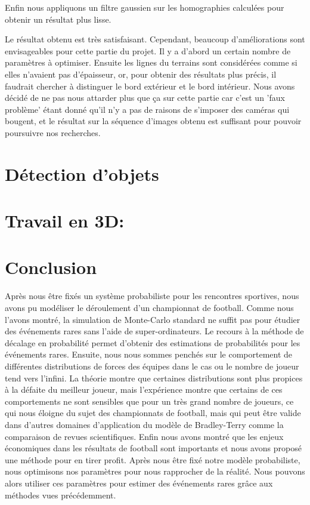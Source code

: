 \documentclass[a4paper]{article}
\begin{document}
Enfin nous appliquons un filtre gaussien sur les homographies calculées pour obtenir un résultat plus lisse.

Le résultat obtenu est très satisfaisant. Cependant, beaucoup d'améliorations sont envisageables pour cette partie du projet. Il y a d'abord un certain nombre de paramètres à optimiser. Ensuite les lignes du terrains sont considérées comme si elles n'avaient pas d'épaisseur, or, pour obtenir des résultats plus précis, il faudrait chercher à distinguer le bord extérieur et le bord intérieur. Nous avons décidé de ne pas nous attarder plus que ça sur cette partie car c'est un 'faux problème' étant donné qu'il n'y a pas de raisons de s'imposer des caméras qui bougent, et le résultat sur la séquence d'images obtenu est suffisant pour pouvoir poursuivre nos recherches.

\section{Détection d'objets}


\section{Travail en 3D:}



\section{Conclusion}
Après nous être fixés un système probabiliste pour les rencontres sportives, nous avons pu modéliser le déroulement d'un championnat de football. Comme nous l'avons montré, la simulation de Monte-Carlo standard ne suffit pas pour étudier des événements rares sans l'aide de super-ordinateurs. Le recours à la méthode de décalage en probabilité permet d'obtenir des estimations de probabilités pour les événements rares. Ensuite, nous nous sommes penchés sur le comportement de différentes distributions de forces des équipes dans le cas ou le nombre de joueur tend vers l'infini. La théorie montre que certaines distributions sont plus propices à la défaite du meilleur joueur, mais l'expérience montre que certains de ces comportements ne sont sensibles que pour un très grand nombre de joueurs, ce qui nous éloigne du sujet des championnats de football, mais qui peut être valide dans d'autres domaines d'application du modèle de Bradley-Terry comme la comparaison de revues scientifiques. Enfin nous avons montré que les enjeux économiques dans les résultats de football sont importants et nous avons proposé une méthode pour en tirer profit. Après nous être fixé notre modèle probabiliste, nous optimisons nos paramètres pour nous rapprocher de la réalité. Nous pouvons alors utiliser ces paramètres pour estimer des événements rares grâce aux méthodes vues précédemment.
\end{document}
